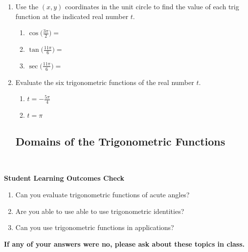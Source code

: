 \begin{enumerate}
\item Use the $(x,y)$ coordinates in the unit circle to find the value of each trig function at the indicated real number $t$.\\

\begin{enumerate}
\item $\displaystyle \cos\Big(\frac{3\pi}{2}\Big)=$\\[.2in]
\item $\displaystyle \tan\Big(\frac{11\pi}{6}\Big)=$\\[.5in]
\item $\displaystyle \sec\Big(\frac{11\pi}{6}\Big)=$\\[.5in]

\end{enumerate}

\item Evaluate the six trigonometric functions of the real number $t$.
\begin{enumerate}

\item $\displaystyle t=-\frac{5\pi}{4}$\vfill
\item $\displaystyle t=\pi$\vfill

\end{enumerate}


\newpage

\subsection{Domains of the Trigonometric Functions} ~

\vfill



\end{enumerate}





\noindent \textbf{Student Learning Outcomes Check}

\begin{enumerate}
\item Can you evaluate trigonometric functions of acute angles?
\item Are you able to use able to use trigonometric identities?
\item Can you use trigonometric functions in applications?
\end{enumerate}

\noindent \textbf{If any of your answers were no, please ask about these topics in class.}

